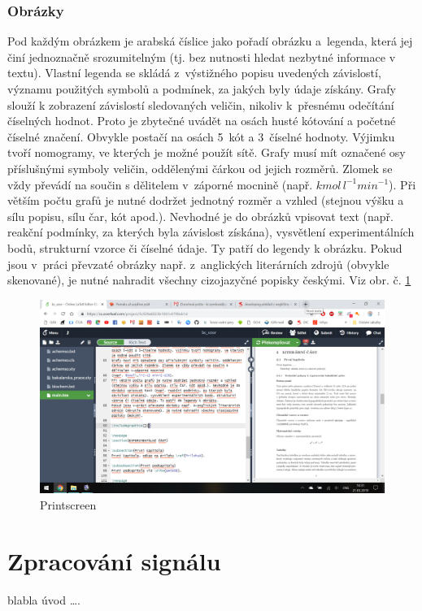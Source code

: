 \documentclass[a4paper, 12pt]{article}
\begin{document}
\subsubsection*{Obrázky}
Pod každým obrázkem je arabská číslice jako pořadí obrázku a~legenda, která jej činí jednoznačně srozumitelným (tj. bez nutnosti hledat nezbytné informace v textu). Vlastní legenda se skládá z~výstižného popisu uvedených závislostí, významu použitých symbolů a podmínek, za jakých byly údaje získány.
Grafy slouží k zobrazení závislostí sledovaných veličin, nikoliv k~přesnému odečítání číselných hodnot. Proto je zbytečné uvádět na osách husté kótování a početné číselné značení. Obvykle postačí na osách 5~kót a 3~číselné hodnoty. Výjimku tvoří nomogramy, ve kterých je možné použít sítě. 
Grafy musí mít označené osy příslušnými symboly veličin, oddělenými čárkou od jejich rozměrů. Zlomek se vždy převádí na součin s dělitelem v~záporné mocnině 
(např. $kmol\,l^{-1} min^{-1}$). 
Při větším počtu grafů je nutné dodržet jednotný rozměr a vzhled (stejnou výšku a sílu popisu, sílu čar, kót apod.). Nevhodné je do obrázků vpisovat text (např. reakční podmínky, za kterých byla závislost získána), vysvětlení experimentálních bodů, strukturní vzorce či číselné údaje. Ty patří do legendy k obrázku. 
Pokud jsou v~práci převzaté obrázky např. z~anglických literárních zdrojů (obvykle skenované), je nutné nahradit všechny cizojazyčné popisky českými. Viz obr. č. \ref{fig:plocha} 

\begin{figure}
\centering
\includegraphics[width=15cm]{test.png}
\caption{Printscreen}
\label{fig:plocha}
\end{figure}

\newpage
\section{Zpracování signálu}
blabla úvod \ldots .
\end{document}
